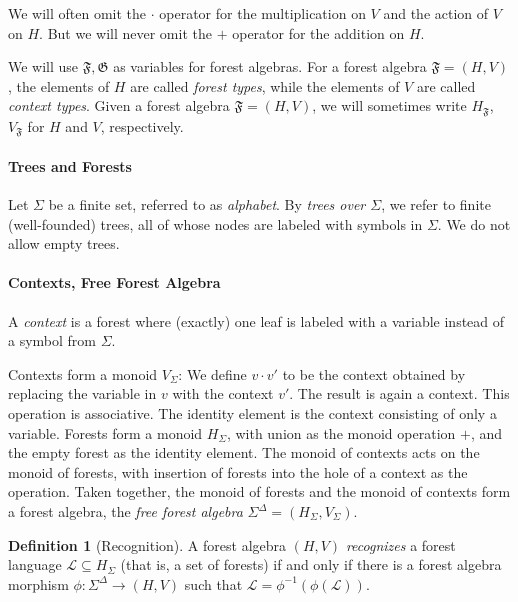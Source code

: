 \documentclass[sigplan,9pt]{acmart}\settopmatter{printfolios=true,printccs=false,printacmref=false}
\newcounter{thm}
\newcounter{theorem}
\theoremstyle{definition}
\newtheorem{defin}[thm]{Definition}
\newcommand{\La}[0]{{\mathcal{L}}}
\newcommand{\Ff}[0]{{\mathfrak{F}}}
\newcommand{\Gg}[0]{{\mathfrak{G}}}
\begin{document}

We will often omit the $\cdot$ operator for the multiplication on $V$ and the action of $V$ on $H$.
But we will never omit the $+$ operator for the addition on $H$.

We will use $\Ff, \Gg$ as variables for forest algebras.
For a forest algebra $\Ff = (H,V)$, the elements of $H$ are called \emph{forest types}, while the elements of $V$ are called \emph{context types}.
Given a forest algebra $\Ff = (H,V)$, we will sometimes write $H_\Ff$, $V_\Ff$ for $H$ and $V$, respectively.


\paragraph{Trees and Forests}
Let $\Sigma$ be a finite set, referred to as \emph{alphabet}.
By \emph{trees over $\Sigma$}, we refer to finite (well-founded) trees, all of whose nodes are labeled with symbols in $\Sigma$.
We do not allow empty trees.



\paragraph{Contexts, Free Forest Algebra}
A \emph{context} is a forest where (exactly) one leaf is labeled with a variable instead of a symbol from $\Sigma$.

Contexts form a monoid $V_\Sigma$: We define $v \cdot v'$ to be the context obtained by replacing the variable in $v$ with the context $v'$. The result is again a context.
This operation is associative.
The identity element is the context consisting of only a variable.
Forests form a monoid $H_\Sigma$, with union as the monoid operation $+$, and the empty forest as the identity element.
The monoid of contexts acts on the monoid of forests, with insertion of forests into the hole of a context as the operation.
Taken together, the monoid of forests and the monoid of contexts form a forest algebra, the \emph{free forest algebra} $\Sigma^\Delta = (H_\Sigma, V_\Sigma)$.

\begin{defin}[Recognition]
A forest algebra $(H,V)$ \emph{recognizes} a forest language $\La \subseteq H_\Sigma$ (that is, a set of forests) if and only if there is a forest algebra morphism $\phi : \Sigma^\Delta \rightarrow (H,V)$ such that $\La = \phi^{-1}(\phi(\La))$.
\end{defin}
\end{document}
